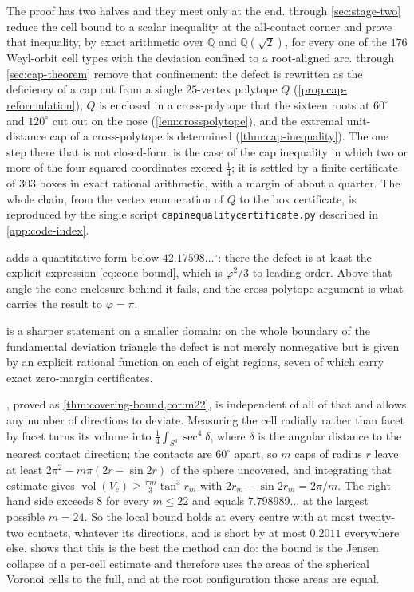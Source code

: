 \documentclass[11pt,reqno]{amsart}
\renewcommand{\_}{\origunderscore\allowbreak}
\numberwithin{equation}{section}
\theoremstyle{plain}
\theoremstyle{definition}
\theoremstyle{remark}
\newcommand{\tilt}{\varphi}                  %
\DeclareMathOperator{\vol}{vol}
\begin{document}
The proof has two halves and they meet only at the end.
 through \cref{sec:stage-two} reduce the cell bound
to a scalar inequality at the all-contact corner and prove that
inequality, by exact arithmetic over $\mathbb{Q}$ and
$\mathbb{Q}(\sqrt2)$, for every one of the $176$ Weyl-orbit cell types
with the deviation confined to a root-aligned arc.
 through \cref{sec:cap-theorem} remove that
confinement: the defect is rewritten as the deficiency of a cap cut
from a single $25$-vertex polytope $Q$
(\cref{prop:cap-reformulation}), $Q$ is enclosed in a cross-polytope
that the sixteen roots at $60^\circ$ and $120^\circ$ cut out on the nose
(\cref{lem:crosspolytope}), and the extremal unit-distance cap of a
cross-polytope is determined
(\cref{thm:cap-inequality}). The one step there that is not closed-form
is the case of the cap inequality in which two or more of the four
squared coordinates exceed $\tfrac14$; it is settled by a finite
certificate of $303$ boxes in exact rational arithmetic, with a margin
of about a quarter. The whole chain, from the vertex enumeration of $Q$
to the box certificate, is reproduced by the single script
\texttt{cap\_inequality\_certificate.py} described in
\cref{app:code-index}.

 adds a quantitative form below
$42.17598\ldots^\circ$: there the defect is at least the explicit
expression \eqref{eq:cone-bound}, which is $\tilt^2/3$ to leading order.
Above that angle the cone enclosure behind it fails, and the
cross-polytope argument is what carries the result to $\tilt=\pi$.

 is a sharper statement on a
smaller domain: on the whole boundary of the fundamental deviation
triangle the defect is not merely nonnegative but is given by an
explicit rational function on each of eight regions, seven of which
carry exact zero-margin certificates.

, proved as
\cref{thm:covering-bound,cor:m22}, is independent of all of that and
allows any number of directions to deviate. Measuring the cell radially
rather than facet by facet turns its volume into
$\tfrac14\int_{S^3}\sec^4\delta$, where $\delta$ is the angular
distance to the nearest contact direction; the contacts are $60^\circ$
apart, so $m$ caps of radius $r$ leave at least
$2\pi^2-m\pi(2r-\sin2r)$ of the sphere uncovered, and integrating that
estimate gives $\vol(V_c)\ge\tfrac{\pi m}{3}\tan^3r_m$ with
$2r_m-\sin2r_m=2\pi/m$. The right-hand side exceeds $8$ for every
$m\le22$ and equals $7.798989\ldots$ at the largest possible $m=24$.
So the local bound holds at every centre with at most twenty-two
contacts, whatever its directions, and is short by at most $0.2011$
everywhere else.
 shows that this is the best the method can do:
the bound is the Jensen collapse of a per-cell estimate and therefore
uses the areas of the spherical Voronoi cells to the full, and at the
root configuration those areas are equal.
\end{document}
